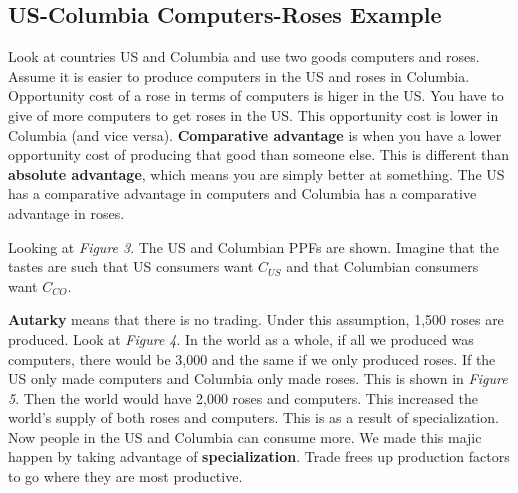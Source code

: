 \documentclass{article}
\begin{document}
\subsection{US-Columbia Computers-Roses Example}

Look at countries US and Columbia and use two goods computers and roses. Assume
it is easier to produce computers in the US and roses in Columbia. Opportunity
cost of a rose in terms of computers is higer in the US. You have to give of
more computers to get roses in the US. This opportunity cost is lower in
Columbia (and vice versa). \textbf{Comparative advantage} is when you have a
lower opportunity cost of producing that good than someone else. This is
different than \textbf{absolute advantage}, which means you are simply better at
something. The US has a comparative advantage in computers and Columbia has a
comparative advantage in roses.

Looking at \textit{Figure 3}. The US and Columbian PPFs are shown. Imagine that
the tastes are such that US consumers want $C_{US}$ and that Columbian consumers
want $C_{CO}$. 

\textbf{Autarky} means that there is no trading. Under this assumption, 1,500
roses are produced. Look at \textit{Figure 4}. In the world as a whole, if all
we produced was computers, there would be 3,000 and the same if we only produced
roses. If the US only made computers and Columbia only made roses. This is shown
in \textit{Figure 5}. Then the world would have 2,000 roses and computers. This
increased the world's supply of both roses and computers. This is as a result of
specialization. Now people in the US and Columbia can consume more. We made this
majic happen by taking advantage of \textbf{specialization}. Trade frees up
production factors to go where they are most productive.
\end{document}
